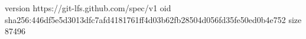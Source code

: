 version https://git-lfs.github.com/spec/v1
oid sha256:446df5e5d3013dfc7afd4181761ff4d03b62fb28504d056fd35fe50ed0b4e752
size 87496
